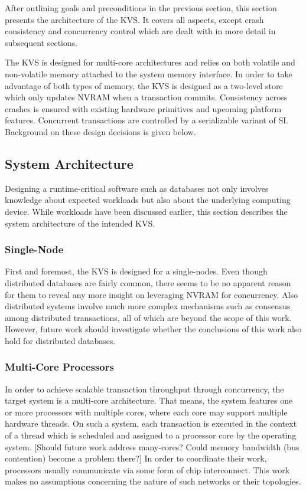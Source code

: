 After outlining goals and preconditions in the previous section, this section
presents the architecture of the KVS. It covers all aspects, except crash
consistency and concurrency control which are dealt with in more detail in
subsequent sections.

The KVS is designed for multi-core architectures and relies on both volatile and
non-volatile memory attached to the system memory interface. In order to take
advantage of both types of memory, the KVS is designed as a two-level store
which only updates NVRAM when a transaction commits. Consistency across crashes
is ensured with existing hardware primitives and upcoming platform features.
Concurrent transactions are controlled by a serializable variant of SI.
Background on these design decisions is given below.

\subsection{System Architecture}

Designing a runtime-critical software such as databases not only involves
knowledge about expected workloads but also about the underlying computing
device. While workloads have been discussed earlier, this section describes the
system architecture of the intended KVS.

\subsubsection{Single-Node}

First and foremost, the KVS is designed for a single-nodes. Even though
distributed databases are fairly common, there seems to be no apparent reason
for them to reveal any more insight on leveraging NVRAM for concurrency. Also
distributed systems involve much more complex mechanisms such as consensus among
distributed transactions, all of which are beyond the scope of this work.
However, future work should investigate whether the conclusions of this work
also hold for distributed databases.

\subsubsection{Multi-Core Processors}

In order to achieve scalable transaction throughput through concurrency, the
target system is a multi-core architecture. That means, the system features one
or more processors with multiple cores, where each core may support multiple
hardware threads. On such a system, each transaction is executed in the context
of a thread which is scheduled and assigned to a processor core by the operating
system. [Should future work address many-cores? Could memory bandwidth (bus
contention) become a problem there?] In order to coordinate their work,
processors usually communicate via some form of chip interconnect. This work
makes no assumptions concerning the nature of such networks or their topologies.

